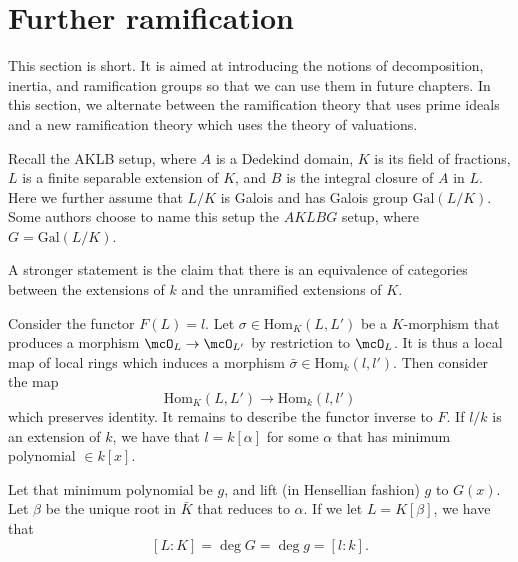 \documentclass[a4paper, 12pt,oneside,openany]{book}
\begin{document}
\section{Further ramification}

This section is short. It is aimed at introducing the notions of decomposition, inertia, and ramification groups so that we can use them in future chapters. In this section, we alternate between the ramification theory that uses prime ideals and a new ramification theory which uses the theory of valuations.

Recall the AKLB setup, where $A$ is a Dedekind domain, $K$ is its field of fractions, $L$ is a finite separable extension of $K$, and $B$ is the integral closure of $A$ in $L$. Here we further assume that $L/K$ is Galois and has Galois group $\text{Gal}(L/K)$. Some authors choose to name this setup the $AKLBG$ setup, where $G = \text{Gal}(L/K)$. 



 A stronger statement is the claim that there is an equivalence of categories between the extensions of $k$ and the unramified extensions of $K$.

Consider the functor $F(L)= l$. Let $\sigma \in \text{Hom}_K(L, L')$ be a $K$-morphism that produces a morphism $\mcO_L \to \mcO_{L'}$ by restriction to $\mcO_L$. It is thus a local map of local rings which induces a morphism $\bar{\sigma} \in \text{Hom}_k(l, l')$. Then consider the map $${\text{Hom}}_K(L, L') \to {\text{Hom}}_k(l, l')$$ which preserves identity. It remains to describe the functor inverse to $F$. If $l/k$ is an extension of $k$, we have that $l = k[\alpha]$ for some $\alpha$ that has minimum polynomial $\in k[x]$.

Let that minimum polynomial be $g$, and lift (in Hensellian fashion) $g$ to $G(x)$. Let $\beta$ be the unique root in $\bar{K}$ that reduces to $\alpha$. If we let $L=K[\beta]$, we have that $$[L:K] = \deg G = \deg g = [l:k].$$
\end{document}
